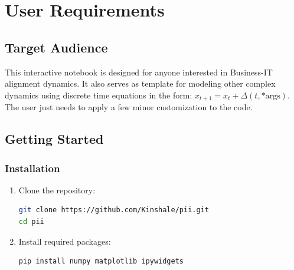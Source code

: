 \documentclass[a4paper, 11pt]{article}
\begin{document}

\section{User Requirements}
\subsection{Target Audience}
This interactive notebook is designed for anyone interested in Business-IT alignment dynamics.
It also serves as template for modeling other complex dynamics using discrete time equations in the form: $x_{t+1} = x_t + \Delta(t, \text{*args})$. The user just needs to apply a few minor customization to the code.

\subsection{Getting Started}
\subsubsection{Installation}
\begin{enumerate}
	\item Clone the repository:
	      \begin{lstlisting}[language=bash]
git clone https://github.com/Kinshale/pii.git
cd pii
    \end{lstlisting}

	\item Install required packages:
	      \begin{lstlisting}[language=bash]
pip install numpy matplotlib ipywidgets
    \end{lstlisting}
\end{enumerate}
\end{document}
